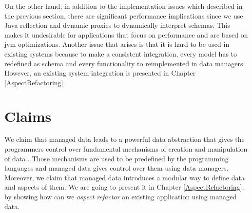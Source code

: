 On the other hand, in addition to the implementation issues which described in the previous section, there are significant performance implications since we use Java reflection and dynamic proxies to dynamically interpret schemas. 
This makes it undesirable for applications that focus on performance and are based on \ac{jvm} optimizations.
Another issue that arises is that it is hard to be used in existing systems because to make a consistent integration, every model has to redefined as schema and every functionality to reimplemented in data managers.
However, an existing system integration is presented in Chapter \ref{AspectRefactoring}.

\section{Claims}\label{Implementation Claims}
We claim that managed data leads to a powerful data abstraction that gives the programmers control over fundamental mechanisms of creation and manipulation of data \cite{loh2012managed}.
Those mechanisms are used to be predefined by the programming languages and managed data gives control over them using data managers.
Moreover, we claim that managed data introduces a modular way to define data and aspects of them. 
We are going to present it in Chapter \ref{AspectRefactoring}, by showing how can we \textit{aspect refactor} an existing application using managed data.
